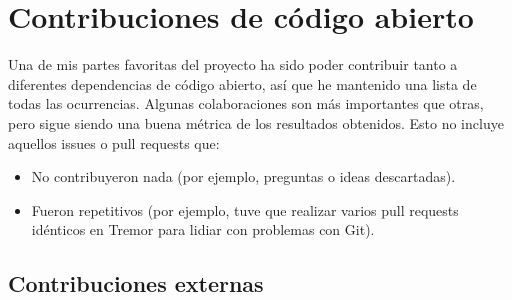 \chapter{Contribuciones de código abierto}\label{annex:contributions}

%
%
%
%
%
%
%
%
%


\newcommand{\issue} {\begingroup
    \catcode`_=12 \github{issues}{Imagenes/issue.pdf}}
\newcommand{\pr} {\begingroup
    \catcode`_=12 \github{pull}{Imagenes/pr.pdf}}
\newcommand{\github}[5] {%
    \item \texttt{[image: \#2]} \; \emph{``#5''}\\
        GitHub \code{#3}~\##4\\
        \url{github.com/#3/#1/#4}
    \endgroup
}

Una de mis partes favoritas del proyecto ha sido poder contribuir tanto a
diferentes dependencias de código abierto, así que he mantenido una lista de
todas las ocurrencias. Algunas colaboraciones son más importantes que otras,
pero sigue siendo una buena métrica de los resultados obtenidos. Esto no incluye
aquellos issues o pull requests que:

\begin{itemize}
    \item No contribuyeron nada (por ejemplo, preguntas o ideas descartadas).

    \item Fueron repetitivos (por ejemplo, tuve que realizar varios pull
        requests idénticos en Tremor para lidiar con problemas con Git).

\end{itemize}

\section{Contribuciones externas}

